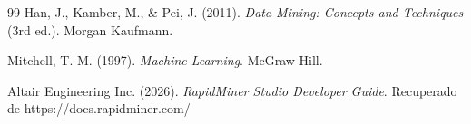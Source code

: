 \documentclass[12pt, letterpaper]{article}
\begin{document}
{
\tableofcontents
}
\newpage

\begin{thebibliography}{99}
    Han, J., Kamber, M., \& Pei, J. (2011). \textit{Data Mining: Concepts and Techniques} (3rd ed.). Morgan Kaufmann.

    Mitchell, T. M. (1997). \textit{Machine Learning}. McGraw-Hill.

    Altair Engineering Inc. (2026). \textit{RapidMiner Studio Developer Guide}. Recuperado de https://docs.rapidminer.com/

    
\end{thebibliography}
\end{document}
